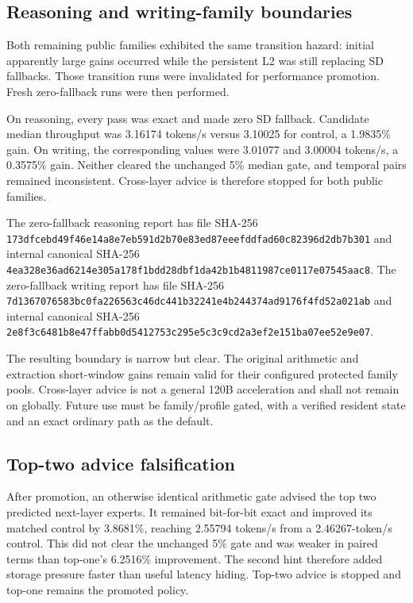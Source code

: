 \subsection{Reasoning and writing-family boundaries}

Both remaining public families exhibited the same transition hazard: initial
apparently large gains occurred while the persistent L2 was still replacing SD
fallbacks.  Those transition runs were invalidated for performance promotion.
Fresh zero-fallback runs were then performed.

On reasoning, every pass was exact and made zero SD fallback.  Candidate
median throughput was 3.16174 tokens/s versus 3.10025 for control, a 1.9835\%
gain.  On writing, the corresponding values were 3.01077 and 3.00004 tokens/s,
a 0.3575\% gain.  Neither cleared the unchanged 5\% median gate, and temporal
pairs remained inconsistent.  Cross-layer advice is therefore stopped for
both public families.

The zero-fallback reasoning report has file SHA-256
\texttt{173dfcebd49f46e14a8e7eb591d2b70e83ed87eeefddfad60c82396d2db7b301}
and internal canonical SHA-256
\texttt{4ea328e36ad6214e305a178f1bdd28dbf1da42b1b4811987ce0117e07545aac8}.
The zero-fallback writing report has file SHA-256
\texttt{7d1367076583bc0fa226563c46dc441b32241e4b244374ad9176f4fd52a021ab}
and internal canonical SHA-256
\texttt{2e8f3c6481b8e47ffabb0d5412753c295e5c3c9cd2a3ef2e151ba07ee52e9e07}.

The resulting boundary is narrow but clear.  The original arithmetic and
extraction short-window gains remain valid for their configured protected
family pools.  Cross-layer advice is not a general 120B acceleration and shall
not remain on globally.  Future use must be family/profile gated, with a
verified resident state and an exact ordinary path as the default.

\subsection{Top-two advice falsification}

After promotion, an otherwise identical arithmetic gate advised the top two
predicted next-layer experts.  It remained bit-for-bit exact and improved its
matched control by 3.8681\%, reaching 2.55794 tokens/s from a 2.46267-token/s
control.  This did not clear the unchanged 5\% gate and was weaker in paired
terms than top-one's 6.2516\% improvement.  The second hint therefore added
storage pressure faster than useful latency hiding.  Top-two advice is stopped
and top-one remains the promoted policy.

